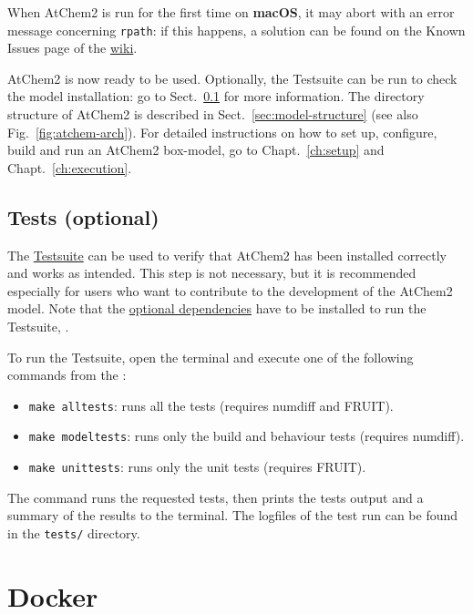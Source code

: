 When AtChem2 is run for the first time on \textbf{macOS}, it may abort
with an error message concerning \texttt{rpath}: if this happens, a
solution can be found on the Known Issues page of the
\href{https://github.com/AtChem/AtChem2/wiki/Known-Issues}{wiki}.

AtChem2 is now ready to be used. Optionally, the Testsuite can be run
to check the model installation: go to Sect.~\ref{subsec:tests-optional}
for more information. The directory structure of AtChem2 is described
in Sect.~\ref{sec:model-structure} (see also Fig.~\ref{fig:atchem-arch}).
For detailed instructions on how to set up, configure, build and
run an AtChem2 box-model, go to Chapt.~\ref{ch:setup} and
Chapt.~\ref{ch:execution}.

\subsection{Tests (optional)} \label{subsec:tests-optional}

The \hyperref[sec:test-suite]{Testsuite} can be used to verify that
AtChem2 has been installed correctly and works as intended. This step
is not necessary, but it is recommended especially for users who want
to contribute to the development of the AtChem2 model. Note that the
\hyperref[subsec:optional-dependencies]{optional dependencies} have to
be installed to run the Testsuite, .

To run the Testsuite, open the terminal and execute one of the
following commands from the \maindir:

\begin{itemize}
\item \verb|make alltests|: runs all the tests (requires numdiff and FRUIT).
\item \verb|make modeltests|: runs only the build and behaviour tests
  (requires numdiff).
\item \verb|make unittests|: runs only the unit tests (requires FRUIT).
\end{itemize}

The command runs the requested tests, then prints the tests output and
a summary of the results to the terminal. The logfiles of the test run
can be found in the \texttt{tests/} directory.

\section{Docker} \label{sec:docker}

